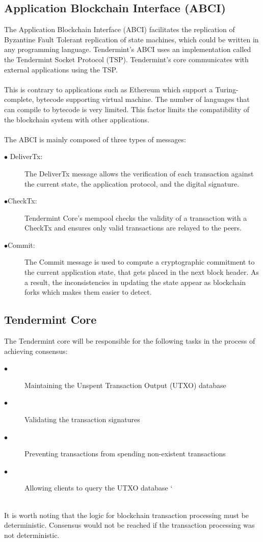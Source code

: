 \documentclass[a4paper,twoside,phd]{BYUPhys}
\begin{document}
\subsection{Application Blockchain Interface (ABCI)}
The Application Blockchain Interface (ABCI) facilitates the replication of Byzantine Fault Tolerant replication of state machines, which could be written in any programming language\cite{Kwon2018ALedgers}. Tendermint's ABCI uses an implementation called the Tendermint Socket Protocol (TSP)\cite{TendermintTeam2018WhatDocumentation}. Tendermint's core communicates with external applications using the TSP\cite{TendermintTeam2018WhatDocumentation}.
\\
\\
This is contrary to applications such as Ethereum which support a Turing-complete, bytecode supporting virtual machine\cite{Wood2018ETHEREUM:LEDGER}. The number of languages that can compile to bytecode is very limited. This factor limits the compatibility of the blockchain system with other applications.
\\
\\
The ABCI is mainly composed of three types of messages\cite{TendermintTeam2018WhatDocumentation}:
\begin{description}
\item[$\bullet$ DeliverTx:] The DeliverTx message allows the verification of each transaction against the current state,  the application protocol, and the digital signature.
\item[$\bullet$CheckTx:] Tendermint Core's mempool checks the validity of a transaction with a CheckTx and ensures only valid transactions are relayed to the peers.
\item[$\bullet$Commit:] The Commit message is used to compute a cryptographic commitment to the current application state, that gets placed in the next block header. As a result, the inconsistencies in updating the state appear as blockchain forks which makes them easier to detect.
\end{description}

\subsection{Tendermint Core}
The Tendermint core will be responsible for the following tasks in the process of achieving consensus\cite{TendermintTeam2018WhatDocumentation}:
\begin{description}
\item[$\bullet$]Maintaining the Unspent Transaction Output (UTXO) database
\item[$\bullet$]Validating the transaction signatures
\item[$\bullet$]Preventing transactions from spending non-existent transactions
\item[$\bullet$]Allowing clients to query the UTXO database
`
\end{description}
\\
It is worth noting that the logic for blockchain transaction processing must be deterministic. Consensus would not be reached if the transaction processing was not deterministic\cite{TendermintTeam2018WhatDocumentation}. 
\label{chap:LitReview}
\end{document}
